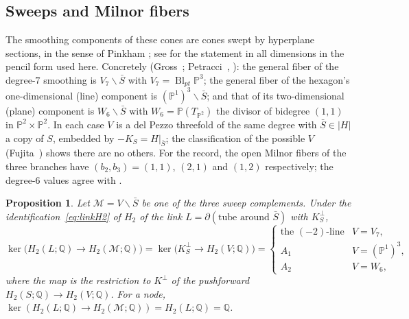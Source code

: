 \documentclass[11pt]{amsart}
\newtheorem{proposition}[theorem]{Proposition}
\theoremstyle{definition}
\theoremstyle{remark}
\theoremstyle{plain}
\newcommand{\QQ}{\mathbb{Q}}
\newcommand{\PP}{\mathbb{P}}
\newcommand{\Mil}{\mathcal{M}}  %
\newcommand{\Bl}{\operatorname{Bl}}
\newcommand{\Sb}{\bar{S}}
\begin{document}
\subsection{Sweeps and Milnor fibers}\label{sec:sweeps}
The smoothing components of these cones are cones swept by hyperplane
sections, in the sense of Pinkham
\cite[(4.2),\,(5.1),\,(5.5)]{Pinkham74}; see
\cite[Lemma~4.1, Proposition~4.2]{PP15} for the statement in all
dimensions in the pencil form used here.  Concretely
(Gross~\cite[\S5.5]{Gross97};
Petracci~\cite[Proposition~2.2]{Petracci20},
\cite[Proposition~4.12]{Petracci19}): the general fiber of the
degree-$7$ smoothing is $V_7\smallsetminus\Sb$ with
$V_7=\Bl_{pt}\PP^3$; the general fiber of the hexagon's one-dimensional
(line) component is $(\PP^1)^3\smallsetminus\Sb$; and that of its
two-dimensional (plane) component is
$W_6\smallsetminus\Sb$ with $W_6=\PP(T_{\PP^2})$ the divisor of bidegree
$(1,1)$ in $\PP^2\times\PP^2$.  In each case $V$ is a del Pezzo
threefold of the same degree with $\Sb\in|H|$ a copy of $S$, embedded
by $-K_S=H|_{\Sb}$; the classification of the possible $V$
(Fujita~\cite[(5.8),\,(5.16)]{Fujita80a}) shows there are no others.
For the record, the open Milnor fibers of the three branches have
$(b_2,b_3)=(1,1)$, $(2,1)$ and $(1,2)$ respectively; the degree-$6$
values agree with \cite[Proposition~3.5]{KP21}.

\begin{proposition}\label{prop:kernels}
Let $\Mil=V\smallsetminus\Sb$ be one of the three sweep complements.
Under the identification~\eqref{eq:linkH2} of $H_2$ of the link
$L=\partial(\text{tube around }\Sb)$ with $K^{\perp}_{S}$,
\[
\ker\bigl(H_2(L;\QQ)\to H_2(\Mil;\QQ)\bigr)
=\ker\bigl(K^{\perp}_S\to H_2(V;\QQ)\bigr)=
\begin{cases}
\text{the }(-2)\text{-line} & V=V_7,\\
A_1 & V=(\PP^1)^3,\\
A_2 & V=W_6,
\end{cases}
\]
where the map is the restriction to $K^\perp$ of the pushforward
$H_2(S;\QQ)\to H_2(V;\QQ)$.  For a node,
$\ker(H_2(L;\QQ)\to H_2(\Mil;\QQ))=H_2(L;\QQ)=\QQ$.
\end{proposition}
\end{document}
